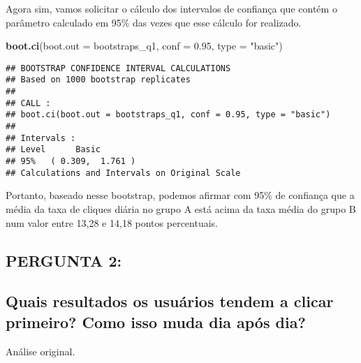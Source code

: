 \documentclass[]{article}
\newenvironment{Shaded}{\begin{snugshade}}{\end{snugshade}}
\newcommand{\KeywordTok}[1]{\textcolor[rgb]{0.13,0.29,0.53}{\textbf{#1}}}
\newcommand{\DataTypeTok}[1]{\textcolor[rgb]{0.13,0.29,0.53}{#1}}
\newcommand{\FloatTok}[1]{\textcolor[rgb]{0.00,0.00,0.81}{#1}}
\newcommand{\StringTok}[1]{\textcolor[rgb]{0.31,0.60,0.02}{#1}}
\newcommand{\NormalTok}[1]{#1}
\begin{document}
Agora sim, vamos solicitar o cálculo dos intervalos de confiança que
contém o parâmetro calculado em 95\% das vezes que esse cálculo for
realizado.

\begin{Shaded}
\begin{Highlighting}[]
\KeywordTok{boot.ci}\NormalTok{(}\DataTypeTok{boot.out =}\NormalTok{ bootstraps_q1, }\DataTypeTok{conf =} \FloatTok{0.95}\NormalTok{, }\DataTypeTok{type =} \StringTok{"basic"}\NormalTok{)}
\end{Highlighting}
\end{Shaded}

\begin{verbatim}
## BOOTSTRAP CONFIDENCE INTERVAL CALCULATIONS
## Based on 1000 bootstrap replicates
## 
## CALL : 
## boot.ci(boot.out = bootstraps_q1, conf = 0.95, type = "basic")
## 
## Intervals : 
## Level      Basic         
## 95%   ( 0.309,  1.761 )  
## Calculations and Intervals on Original Scale
\end{verbatim}

Portanto, baseado nesse bootstrap, podemos afirmar com 95\% de confiança
que a média da taxa de cliques diária no grupo A está acima da taxa
média do grupo B num valor entre 13,28 e 14,18 pontos percentuais.

\subsection{PERGUNTA 2:}\label{pergunta-2}

\subsection{Quais resultados os usuários tendem a clicar primeiro? Como
isso muda dia após
dia?}\label{quais-resultados-os-usuarios-tendem-a-clicar-primeiro-como-isso-muda-dia-apos-dia}

Análise original.
\end{document}
